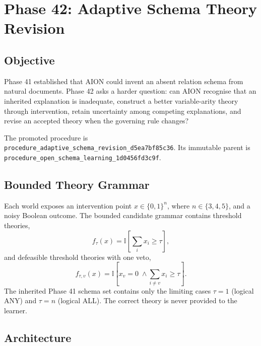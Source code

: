 \section{Phase 42: Adaptive Schema Theory Revision}
\label{sec:hexcore-phase42}

\subsection{Objective}

Phase 41 established that AION could invent an absent relation schema from
natural documents. Phase 42 asks a harder question: can AION recognise that an
inherited explanation is inadequate, construct a better variable-arity theory
through intervention, retain uncertainty among competing explanations, and
revise an accepted theory when the governing rule changes?

The promoted procedure is
\texttt{procedure\_adaptive\_schema\_revision\_d5ea7bf85c36}. Its immutable
parent is
\texttt{procedure\_open\_schema\_learning\_1d0456fd3c9f}.

\subsection{Bounded Theory Grammar}

Each world exposes an intervention point
$x\in\{0,1\}^{n}$, where $n\in\{3,4,5\}$, and a noisy Boolean outcome.
The bounded candidate grammar contains threshold theories,
\begin{equation}
  f_{\tau}(x)=
  \mathbb{I}\!\left[\sum_i x_i\geq\tau\right],
\end{equation}
and defeasible threshold theories with one veto,
\begin{equation}
  f_{\tau,v}(x)=
  \mathbb{I}\!\left[
    x_v=0 \;\land\!
    \sum_{i\neq v}x_i\geq\tau
  \right].
\end{equation}
The inherited Phase 41 schema set contains only the limiting cases
$\tau=1$ (logical ANY) and $\tau=n$ (logical ALL). The correct theory is never
provided to the learner.

\subsection{Architecture}

